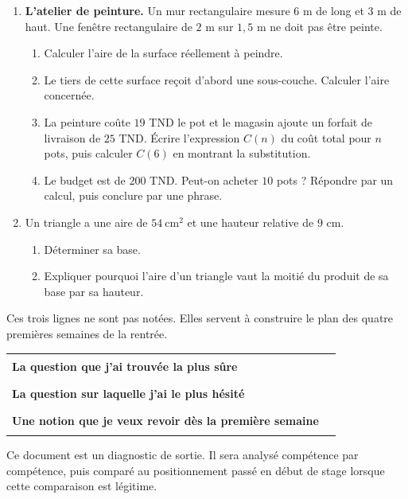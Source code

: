 \documentclass[10pt,a4paper]{article}
\begin{document}
\begin{enumerate}
\needspace{22mm}
\item[\textbf{C1.}] \textbf{L'atelier de peinture.} Un mur rectangulaire mesure $6$ m de long et $3$ m de haut.
Une fenêtre rectangulaire de $2$ m sur $1{,}5$ m ne doit pas être peinte.
\begin{enumerate}
\item Calculer l'aire de la surface réellement à peindre.
\item Le tiers de cette surface reçoit d'abord une sous-couche. Calculer l'aire concernée.
\item La peinture coûte $19$ TND le pot et le magasin ajoute un forfait de livraison de $25$ TND.
Écrire l'expression $C(n)$ du coût total pour $n$ pots, puis calculer $C(6)$ en montrant la substitution.
\item Le budget est de $200$ TND. Peut-on acheter $10$ pots ? Répondre par un calcul, puis conclure par une phrase.
\end{enumerate}
\par\vspace{1.2mm}
\needspace{22mm}
\item[\textbf{C2.}] Un triangle a une aire de $54\ \text{cm}^2$ et une hauteur relative de $9$ cm.
\begin{enumerate}
\item Déterminer sa base.
\item Expliquer pourquoi l'aire d'un triangle vaut la moitié du produit de sa base par sa hauteur.
\end{enumerate}
\par\vspace{1.2mm}
\end{enumerate}
\brouillon{\dimexpr\textheight/3\relax}
\newpage
{}
\begin{methodbox}Ces trois lignes ne sont pas notées. Elles servent à construire le plan des quatre premières semaines de la rentrée.\end{methodbox}
\par\noindent\begin{tabularx}{\linewidth}{>{\bfseries}p{62mm} X}
\toprule
La question que j'ai trouvée la plus sûre & \rule{85mm}{0.32pt} \\
La question sur laquelle j'ai le plus hésité & \rule{85mm}{0.32pt} \\
Une notion que je veux revoir dès la première semaine & \rule{85mm}{0.32pt} \\
\bottomrule\end{tabularx}
\vfill
\begin{graybox}\small Ce document est un diagnostic de sortie. Il sera analysé compétence par compétence, puis comparé au positionnement passé en début de stage lorsque cette comparaison est légitime.\end{graybox}
\end{document}
